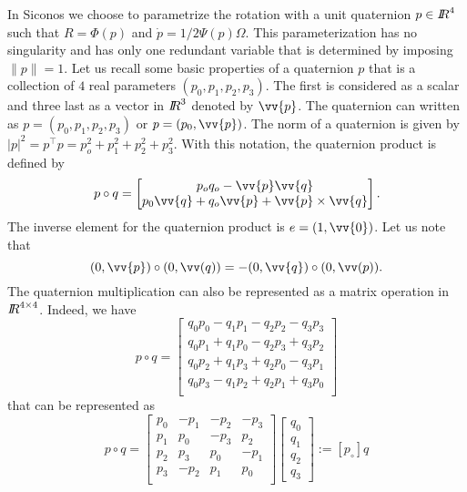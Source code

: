 In Siconos we choose to parametrize the rotation with a unit quaternion $p \in \mbox{\rm $I\!\!R$}^4$ such that $R = \Phi(p)$ and $\dot p = 1/2 \Psi(p)\Omega $. This parameterization has no singularity and has only one redundant variable that is determined by imposing $\|p\|=1$.
 Let us recall some basic properties of a quaternion $p$ that is a collection of $4$ real parameters $(p_0,p_1,p_2,p_3)$. The first is considered as a scalar and three last as a vector in $\mbox{\rm $I\!\!R$}^3$ denoted by $\vv{p}$. The quaternion can written as $p=(p_0,p_1,p_2,p_3)$ or $p=(p_0,\vv{p})$. The norm of a quaternion is given by $|p|^2=p^\top p = p_o^2+p_1^2+p_2^2+p_3^2$.
 With this notation, the quaternion product is defined by
\begin{equation}
  \label{eq:25}
  p \circ q =
  \begin{bmatrix}
    p_oq_o - \vv{p}\vv{q} \\
    p_0\vv{q}+q_o\vv{p} + \vv{p}\times\vv{q}
  \end{bmatrix}.
\end{equation}
The inverse element for the quaternion product is $e= (1,\vv{0})$. Let us note that 
\begin{equation}
  \label{eq:36}
  (0,\vv{p})\circ (0,\vv(q)) = - (0,\vv{q})\circ (0,\vv(p)).
\end{equation}
The quaternion multiplication can also be represented as a matrix operation in $\mbox{\rm $I\!\!R$}^{4\times4}$. Indeed, we have
\begin{equation}
  \label{eq:26}
  p \circ q  =
  \begin{bmatrix}
    q_0 p_0 -q_1p_1-q_2p_2-q_3p_3\\
    q_0 p_1 +q_1p_0-q_2p_3+q_3p_2\\
    q_0 p_2 +q_1p_3+q_2p_0-q_3p_1\\
    q_0 p_3 -q_1p_2+q_2p_1+q_3p_0\\
  \end{bmatrix}
\end{equation}
that can be represented as
\begin{equation}
  \label{eq:26}
  p \circ q  =
  \begin{bmatrix}
    p_0 & -p_1 & -p_2 & -p_3 \\
    p_1 & p_0 & -p_3 & p_2 \\
    p_2 & p_3 & p_0 & -p_1 \\
    p_3 & -p_2 & p_1 & p_0 \\
  \end{bmatrix}
  \begin{bmatrix}
    q_0\\
    q_1\\
    q_2\\
    q_3
  \end{bmatrix} := [p_\circ]q
\end{equation}

